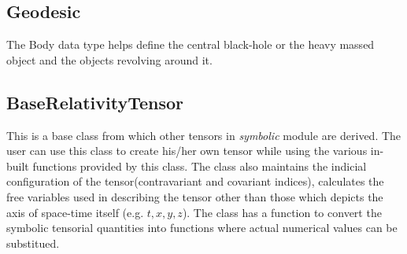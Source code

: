 \documentclass{aastex63}
\begin{document}
\subsection{Geodesic} \label{subsec:Geodesic}
The Body data type helps define the central black-hole or the heavy massed object and the objects revolving around it. 

\subsection{BaseRelativityTensor} \label{subsec:BaseRelativityTensor}
This is a base class from which other tensors in \textit{symbolic} module are derived. The user can use this class to create his/her own tensor while using the various in-built functions provided by this class. The class also maintains the indicial configuration of the tensor(contravariant and covariant indices), calculates the free variables used in describing the tensor other than those which depicts the axis of space-time itself (e.g. $t, x, y, z$). The class has a function to convert the symbolic tensorial quantities into functions where actual numerical values can be substitued.

\end{document}
